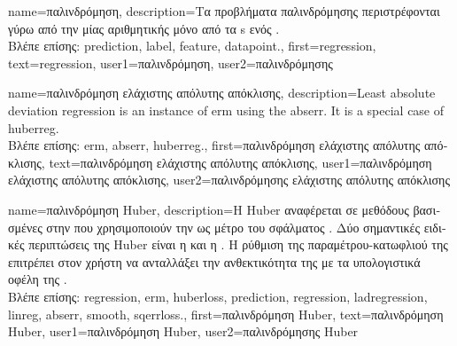 {name={\foreignlanguage{greek}{παλινδρόμηση}},
	description={\foreignlanguage{greek}{Τα προβλήματα παλινδρόμησης} 
		\foreignlanguage{greek}{περιστρέφονται γύρω από την}  
		 \foreignlanguage{greek}{μίας αριθμητικής}  \foreignlanguage{greek}{μόνο από τα} 
		s \foreignlanguage{greek}{ενός}  \cite[\foreignlanguage{greek}{Κεφ.} 2]{MLBasics}.\\
		\foreignlanguage{greek}{Βλέπε επίσης:} \gls{prediction}, \gls{label}, \gls{feature}, \gls{datapoint}.},
	first={regression},
	text={regression},
	user1={\foreignlanguage{greek}{παλινδρόμηση}}, %
  	user2={\foreignlanguage{greek}{παλινδρόμησης}} %
}

{name={\foreignlanguage{greek}{παλινδρόμηση ελάχιστης απόλυτης απόκλισης}},
	description={Least absolute deviation regression is 
		an instance of \gls{erm} using the \gls{abserr}. It is a special case of 
		\gls{huberreg}.\\
		\foreignlanguage{greek}{Βλέπε επίσης:} \gls{erm}, \gls{abserr}, \gls{huberreg}.},
		first={\foreignlanguage{greek}{παλινδρόμηση ελάχιστης απόλυτης απόκλισης}},
		text={\foreignlanguage{greek}{παλινδρόμηση ελάχιστης απόλυτης απόκλισης}},
		user1={\foreignlanguage{greek}{παλινδρόμηση ελάχιστης απόλυτης απόκλισης}}, %
		user2={\foreignlanguage{greek}{παλινδρόμησης ελάχιστης απόλυτης απόκλισης}} %
}

{name={\foreignlanguage{greek}{παλινδρόμηση} Huber},
	description={\foreignlanguage{greek}{Η}  Huber 
		\foreignlanguage{greek}{αναφέρεται σε μεθόδους βασισμένες στην}  
		\foreignlanguage{greek}{που χρησιμοποιούν την}  \foreignlanguage{greek}{ως μέτρο του σφάλματος} . 
		\foreignlanguage{greek}{Δύο σημαντικές ειδικές περιπτώσεις της}  Huber \foreignlanguage{greek}{είναι η} 
		 \foreignlanguage{greek}{και η} . \foreignlanguage{greek}{Η ρύθμιση της παραμέτρου-κατωφλιού 
		της}  \foreignlanguage{greek}{επιτρέπει στον χρήστη να ανταλλάξει την ανθεκτικότητα της}  
		\foreignlanguage{greek}{με τα υπολογιστικά οφέλη της}  .\\
	\foreignlanguage{greek}{Βλέπε επίσης:} \gls{regression}, \gls{erm}, \gls{huberloss}, \gls{prediction}, \gls{regression}, \gls{ladregression}, \gls{linreg}, \gls{abserr}, \gls{smooth}, \gls{sqerrloss}.},
			first={\foreignlanguage{greek}{παλινδρόμηση} Huber},
			text={\foreignlanguage{greek}{παλινδρόμηση} Huber},
			user1={\foreignlanguage{greek}{παλινδρόμηση} Huber}, %
			user2={\foreignlanguage{greek}{παλινδρόμησης} Huber} %
}

